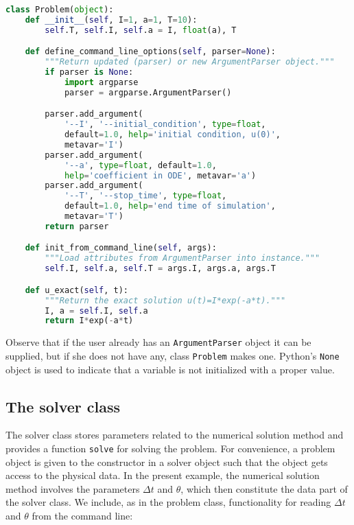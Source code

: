 \documentclass[graybox,sectrefs,envcountresetchap,open=right,final]{svmonodo}
\begin{document}
\begin{lstlisting}[language=python,style=blue1_bluegreen]
class Problem(object):
    def __init__(self, I=1, a=1, T=10):
        self.T, self.I, self.a = I, float(a), T

    def define_command_line_options(self, parser=None):
        """Return updated (parser) or new ArgumentParser object."""
        if parser is None:
            import argparse
            parser = argparse.ArgumentParser()

        parser.add_argument(
            '--I', '--initial_condition', type=float,
            default=1.0, help='initial condition, u(0)',
            metavar='I')
        parser.add_argument(
            '--a', type=float, default=1.0,
            help='coefficient in ODE', metavar='a')
        parser.add_argument(
            '--T', '--stop_time', type=float,
            default=1.0, help='end time of simulation',
            metavar='T')
        return parser

    def init_from_command_line(self, args):
        """Load attributes from ArgumentParser into instance."""
        self.I, self.a, self.T = args.I, args.a, args.T

    def u_exact(self, t):
        """Return the exact solution u(t)=I*exp(-a*t)."""
        I, a = self.I, self.a
        return I*exp(-a*t)

\end{lstlisting}

Observe that if the user already has an \texttt{ArgumentParser} object it can be
supplied, but if she does not have any, class \texttt{Problem} makes one.
Python's \texttt{None} object is used to indicate that a variable is not
initialized with a proper value.

\subsection{The solver class}


The solver class stores parameters related to the numerical solution method
and provides a function \texttt{solve} for solving the problem.
For convenience, a problem object is given to the constructor
in a solver object such that the object gets access to the
physical data. In the present example,
the numerical solution method involves the parameters $\Delta t$
and $\theta$, which then constitute the data part of the solver class.
We include, as in the problem class, functionality for
reading $\Delta t$ and $\theta$ from the command line:
\end{document}
